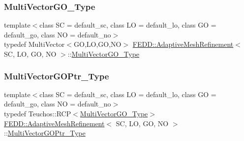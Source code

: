 \subsubsection{\texorpdfstring{Multi\+Vector\+G\+O\+\_\+\+Type}{MultiVectorGO\_Type}}
{\footnotesize\ttfamily template$<$class SC = default\+\_\+sc, class LO = default\+\_\+lo, class GO = default\+\_\+go, class NO = default\+\_\+no$>$ \\
typedef Multi\+Vector$<$GO,LO,GO,NO$>$ \hyperlink{classFEDD_1_1AdaptiveMeshRefinement}{F\+E\+D\+D\+::\+Adaptive\+Mesh\+Refinement}$<$ SC, LO, GO, NO $>$\+::\hyperlink{classFEDD_1_1AdaptiveMeshRefinement_a582403f1b9f5ba542a6269e1b00a9031}{Multi\+Vector\+G\+O\+\_\+\+Type}}

\mbox{\label{classFEDD_1_1AdaptiveMeshRefinement_ab2378e2061f0df4ec2df4a44af300996}} 
\subsubsection{\texorpdfstring{Multi\+Vector\+G\+O\+Ptr\+\_\+\+Type}{MultiVectorGOPtr\_Type}}
{\footnotesize\ttfamily template$<$class SC = default\+\_\+sc, class LO = default\+\_\+lo, class GO = default\+\_\+go, class NO = default\+\_\+no$>$ \\
typedef Teuchos\+::\+R\+CP$<$\hyperlink{classFEDD_1_1AdaptiveMeshRefinement_a582403f1b9f5ba542a6269e1b00a9031}{Multi\+Vector\+G\+O\+\_\+\+Type}$>$ \hyperlink{classFEDD_1_1AdaptiveMeshRefinement}{F\+E\+D\+D\+::\+Adaptive\+Mesh\+Refinement}$<$ SC, LO, GO, NO $>$\+::\hyperlink{classFEDD_1_1AdaptiveMeshRefinement_ab2378e2061f0df4ec2df4a44af300996}{Multi\+Vector\+G\+O\+Ptr\+\_\+\+Type}}

\mbox{\label{classFEDD_1_1AdaptiveMeshRefinement_ae48fff0bc9a94bc0332516f1d1e05d92}} 
